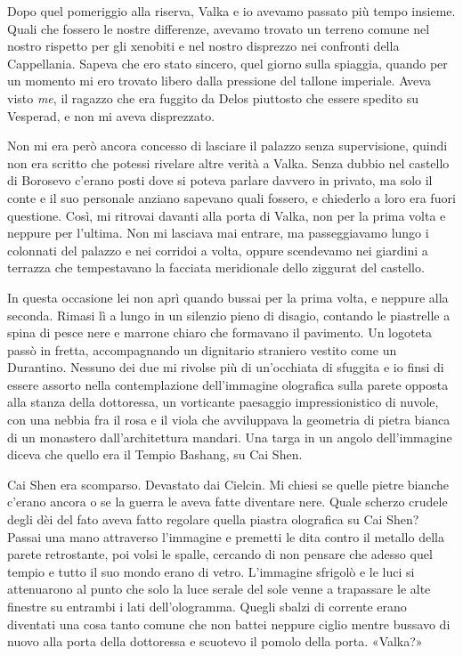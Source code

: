 Dopo quel pomeriggio alla riserva, Valka e io avevamo passato più tempo
insieme. Quali che fossero le nostre differenze, avevamo trovato un
terreno comune nel nostro rispetto per gli xenobiti e nel nostro
disprezzo nei confronti della Cappellania. Sapeva che ero stato sincero,
quel giorno sulla spiaggia, quando per un momento mi ero trovato libero
dalla pressione del tallone imperiale. Aveva visto \emph{me}, il ragazzo
che era fuggito da Delos piuttosto che essere spedito su Vesperad, e non
mi aveva disprezzato.

Non mi era però ancora concesso di lasciare il palazzo senza
supervisione, quindi non era scritto che potessi rivelare altre verità a
Valka. Senza dubbio nel castello di Borosevo c'erano posti dove si
poteva parlare davvero in privato, ma solo il conte e il suo personale
anziano sapevano quali fossero, e chiederlo a loro era fuori questione.
Così, mi ritrovai davanti alla porta di Valka, non per la prima volta e
neppure per l'ultima. Non mi lasciava mai entrare, ma passeggiavamo
lungo i colonnati del palazzo e nei corridoi a volta, oppure scendevamo
nei giardini a terrazza che tempestavano la facciata meridionale dello
ziggurat del castello.

In questa occasione lei non aprì quando bussai per la prima volta, e
neppure alla seconda. Rimasi lì a lungo in un silenzio pieno di disagio,
contando le piastrelle a spina di pesce nere e marrone chiaro che
formavano il pavimento. Un logoteta passò in fretta, accompagnando un
dignitario straniero vestito come un Durantino. Nessuno dei due mi
rivolse più di un'occhiata di sfuggita e io finsi di essere assorto
nella contemplazione dell'immagine olografica sulla parete opposta alla
stanza della dottoressa, un vorticante paesaggio impressionistico di
nuvole, con una nebbia fra il rosa e il viola che avviluppava la
geometria di pietra bianca di un monastero dall'architettura mandari.
Una targa in un angolo dell'immagine diceva che quello era il Tempio
Bashang, su Cai Shen.

Cai Shen era scomparso. Devastato dai Cielcin. Mi chiesi se quelle
pietre bianche c'erano ancora o se la guerra le aveva fatte diventare
nere. Quale scherzo crudele degli dèi del fato aveva fatto regolare
quella piastra olografica su Cai Shen? Passai una mano attraverso
l'immagine e premetti le dita contro il metallo della parete
retrostante, poi volsi le spalle, cercando di non pensare che adesso
quel tempio e tutto il suo mondo erano di vetro. L'immagine sfrigolò e
le luci si attenuarono al punto che solo la luce serale del sole venne a
trapassare le alte finestre su entrambi i lati dell'ologramma. Quegli
sbalzi di corrente erano diventati una cosa tanto comune che non battei
neppure ciglio mentre bussavo di nuovo alla porta della dottoressa e
scuotevo il pomolo della porta. «Valka?»

